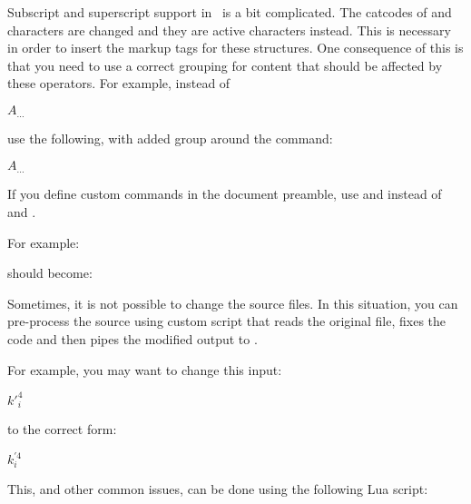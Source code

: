 
Subscript and superscript support in \texfourht\ is a bit complicated. The
catcodes of \texcommand{_} and \texcommand{^} characters are changed and they are
active characters instead. This is necessary in order to insert the markup tags
for these structures. One consequence of this is that you need to use a correct grouping
for content that should be affected by these operators.
For example, instead of 

\begin{texsource}
$A_\mathit{...}$
\end{texsource}

use the following, with added group around the \texcommand{\mathit} command:

\begin{texsource}
$A_{\mathit{...}}$
\end{texsource}

If you define custom commands in the document preamble, use \texcommand{\sp}
and \texcommand{\sb} instead of \texcommand{^} and \texcommand{_}.

For example:

\begin{texsource}
\newcommand \coeffX [4][X]{\mathbf{#1}_{{#2},{#3}}(#4)}
\end{texsource}

should become:

\begin{texsource}
\newcommand\coeffX [4][X]{{\mathbf{#1}}\sb{#2,#3}(#4)}
\end{texsource}

Sometimes, it is not possible to change the source files. In this situation, you 
can pre-process the source using custom script that reads the original file, fixes the code
and then pipes the modified output to .

For example, you may want to change this input:

\begin{texsource}
$k'^4_{i}$
\end{texsource}

to the correct form:

\begin{texsource}
$k^{\prime 4}_{i}$
\end{texsource}

This, and other common issues, can be done using the following Lua script:

